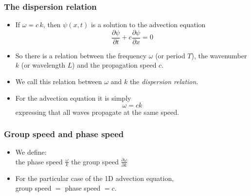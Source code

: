 \documentclass[aspectratio=149,9pt]{beamer}
\begin{document}
%
%
\begin{frame}
	\frametitle{The dispersion relation}
	\vfill\begin{itemize}
		\item If $\omega=c\,k$,	then $\psi(x,t)$ is a solution to the advection equation
			\begin{equation*}
				\frac{\partial \psi}{\partial t}+c\frac{\partial \psi}{\partial x}=0
			\end{equation*}\vfill
		\item So there is a relation between the frequency $\omega$ (or period $T$), the wavenumber $k$ (or wavelength $L$) and the propagation speed $c$.\vfill
		\item We call this relation between $\omega$ and $k$ the \emph{dispersion relation}.\vfill
		\item For the advection equation it is simply
			\begin{equation*}
				\omega = c k
			\end{equation*}
			expressing that all waves propagate at the same speed.
	\end{itemize}\vfill
\end{frame}
%
%
\begin{frame}
	\frametitle{Group speed and phase speed}
	\vfill\begin{itemize}
		\item We define:\\[2ex]
			\qquad the phase speed $\displaystyle\frac{\omega}k$
			\qquad the group speed $\displaystyle\frac{\partial \omega}{\partial k}$\vfill
		\item For the particular case of the 1D advection equation,\\[2ex]
			group speed $=$ phase speed $=c$.\vfill
	\end{itemize}\vfill
\end{frame}
%
%
\end{document}

